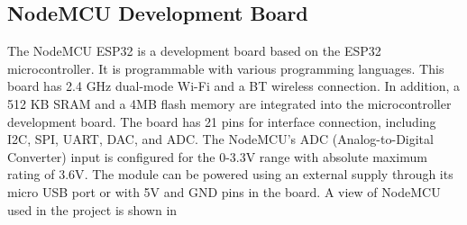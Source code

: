 \subsection{NodeMCU Development Board}

The NodeMCU ESP32 is a development board based on the ESP32 microcontroller. It is programmable with various programming languages. This board has 2.4 GHz dual-mode Wi-Fi and a BT wireless connection. In addition, a 512 KB SRAM and a 4MB flash memory are integrated into the microcontroller development board. The board has 21 pins for interface connection, including I2C, SPI, UART, DAC, and ADC. The NodeMCU's ADC (Analog-to-Digital Converter) input is configured for the 0-3.3V range with absolute maximum rating of 3.6V\cite{esp32}. The module can be powered using an external supply through its micro USB port or with 5V and GND pins in the board. A view of NodeMCU used in the project is shown in 
\vspace{12pt}

